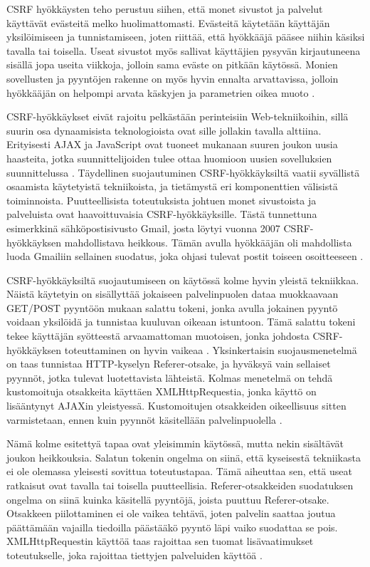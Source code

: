 CSRF hyökkäysten teho perustuu siihen, että monet sivustot ja palvelut
käyttävät evästeitä melko huolimattomasti. Evästeitä käytetään
käyttäjän yksilöimiseen ja tunnistamiseen, joten riittää, että hyökkääjä pääsee niihin käsiksi tavalla tai toisella. Useat sivustot myös sallivat käyttäjien pysyvän kirjautuneena sisällä
jopa useita viikkoja, jolloin sama eväste on pitkään käytössä. Monien sovellusten ja pyyntöjen rakenne on myös hyvin ennalta arvattavissa, jolloin hyökkääjän
on helpompi arvata käskyjen ja parametrien oikea muoto \cite{WEB2}.

CSRF-hyökkäykset eivät rajoitu pelkästään perinteisiin Web-\-tekniikoihin, sillä suurin osa dynaamisista teknologioista ovat sille jollakin 
tavalla alttiina. Erityisesti AJAX ja JavaScript ovat tuoneet mukanaan suuren joukon uusia haasteita, jotka suunnittelijoiden tulee ottaa huomioon uusien
sovelluksien suunnittelussa \cite{WEB2b}. Täydellinen suojautuminen CSRF-\-hyökkäyksiltä vaatii syvällistä osaamista käytetyistä tekniikoista, ja 
tietämystä eri komponenttien välisistä toiminnoista. Puutteellisista
toteutuksista johtuen monet sivustoista ja palveluista ovat haavoittuvaisia
CSRF-\-hyökkäyksille. Tästä tunnettuna esimerkkinä sähköpostisivusto Gmail, josta löytyi vuonna 2007 CSRF-hyökkäyksen mahdollistava heikkous. Tämän avulla
hyökkääjän oli mahdollista luoda Gmailiin sellainen suodatus, joka ohjasi tulevat postit toiseen osoitteeseen \cite{CSRF}. 

CSRF-hyökkäyksiltä suojautumiseen on käytössä kolme hyvin yleistä tekniikkaa. Näistä käytetyin on sisällyttää jokaiseen palvelinpuolen dataa muokkaavaan
GET/POST pyyntöön mukaan salattu tokeni, jonka avulla jokainen pyyntö voidaan yksilöidä ja tunnistaa kuuluvan oikeaan istuntoon. Tämä salattu tokeni tekee
käyttäjän syötteestä arvaamattoman muotoisen, jonka johdosta CSRF-hyökkäyksen toteuttaminen on hyvin vaikeaa \cite{WEB2}. Yksinkertaisin suojausmenetelmä on 
taas tunnistaa HTTP-kyselyn Referer-otsake, ja hyväksyä vain sellaiset pyynnöt, jotka tulevat luotettavista lähteistä. Kolmas menetelmä on tehdä kustomoituja
otsakkeita käyttäen XMLHttpRequestia, jonka käyttö on lisääntynyt AJAXin yleistyessä. Kustomoitujen otsakkeiden oikeellisuus sitten varmistetaan, ennen kuin
pyynnöt käsitellään palvelinpuolella \cite{CSRF}.

Nämä kolme esitettyä tapaa ovat yleisimmin käytössä, mutta nekin sisältävät joukon heikkouksia. Salatun tokenin ongelma on siinä, että kyseisestä tekniikasta ei 
ole olemassa yleisesti sovittua toteutustapaa. Tämä aiheuttaa sen, että useat ratkaisut ovat tavalla tai toisella puutteellisia. Referer-otsakkeiden suodatuksen 
ongelma on siinä kuinka käsitellä pyyntöjä, joista puuttuu Referer-otsake. Otsakkeen piilottaminen ei ole vaikea tehtävä, joten palvelin saattaa joutua 
päättämään vajailla tiedoilla päästääkö pyyntö läpi vaiko suodattaa se pois. XMLHttpRequestin käyttöä taas rajoittaa sen tuomat lisävaatimukset toteutukselle,
joka rajoittaa tiettyjen palveluiden käyttöä \cite{CSRF}. 

